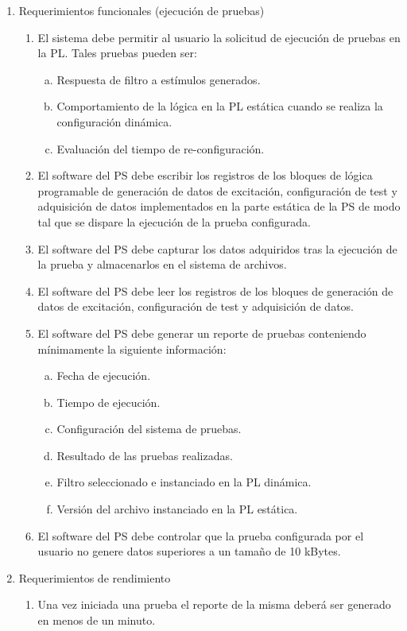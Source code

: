 \documentclass[
11pt, %
]{charter}
\begin{document}
\begin{enumerate}
	\item Requerimientos funcionales (ejecución de pruebas)
	\begin{enumerate}
		\item El sistema debe permitir al usuario la solicitud de ejecución de pruebas en la PL. Tales pruebas pueden ser:
		\begin{enumerate}[a.]
			\item Respuesta de filtro a estímulos generados.
			\item Comportamiento de la lógica en la PL estática cuando se realiza la configuración dinámica.
			\item Evaluación del tiempo de re-configuración.
		\end{enumerate}
		\item El software del PS debe escribir los registros de los bloques de lógica programable de generación de datos de excitación, configuración de test y adquisición de datos implementados en la parte estática de la PS de modo tal que se dispare la ejecución de la prueba configurada.
		\item El software del PS debe capturar los datos adquiridos tras la ejecución de la prueba y almacenarlos en el sistema de archivos.
		\item El software del PS debe leer los registros de los bloques de generación de datos de excitación, configuración de test y adquisición de datos.
		\item El software del PS debe generar un reporte de pruebas conteniendo mínimamente la siguiente información:
		\begin{enumerate}[a.]
			\item Fecha de ejecución.
			\item Tiempo de ejecución.
			\item Configuración del sistema de pruebas.
			\item Resultado de las pruebas realizadas.
			\item Filtro seleccionado e instanciado en la PL dinámica.
			\item Versión del archivo instanciado en la PL estática.	
		\end{enumerate}
		\item El software del PS debe controlar que la prueba configurada por el usuario no genere datos superiores a un tamaño de 10 kBytes.
	\end{enumerate}

	\item Requerimientos de rendimiento
	\begin{enumerate}
		\item Una vez iniciada una prueba el reporte de la misma deberá ser generado en menos de un minuto.
	\end{enumerate}


\end{enumerate}
\end{document}
